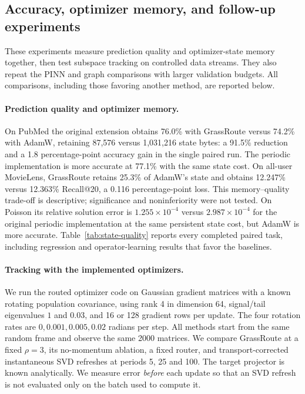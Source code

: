 \subsection{Accuracy, optimizer memory, and follow-up experiments}
\label{sec:strength-followup}
These experiments measure prediction quality and optimizer-state memory
together, then test subspace tracking on controlled data streams. They also
repeat the PINN and graph comparisons with larger validation budgets.
All comparisons, including those favoring another method, are reported below.

\paragraph{Prediction quality and optimizer memory.}
On PubMed the original extension obtains 76.0\% with GrassRoute versus
74.2\% with AdamW, retaining 87,576 versus 1,031,216 state bytes: a 91.5\%
reduction and a 1.8 percentage-point accuracy gain in the single paired run.
The periodic implementation is more accurate at 77.1\% with the same state
cost. On all-user MovieLens, GrassRoute retains 25.3\% of AdamW's state and
obtains 12.247\% versus 12.363\% Recall@20, a 0.116 percentage-point loss.
This memory--quality trade-off is descriptive; significance and
noninferiority were not tested. On Poisson its relative solution error is
$1.255\times10^{-4}$ versus $2.987\times10^{-4}$ for the original periodic
implementation at the same persistent state cost, but AdamW is more accurate.
Table~\ref{tab:state-quality} reports every completed paired task,
including regression and operator-learning results that favor the baselines.

\paragraph{Tracking with the implemented optimizers.}
We run the routed optimizer code on Gaussian gradient matrices with a known
rotating population covariance, using rank 4 in dimension 64, signal/tail
eigenvalues $1$ and $0.03$, and 16 or 128 gradient rows per update. The four
rotation rates are $0,0.001,0.005,0.02$ radians per step. All methods start
from the same random frame and observe the same 2000 matrices. We compare
GrassRoute at a fixed $\rho=3$, its no-momentum ablation, a fixed router,
and transport-corrected instantaneous SVD refreshes at periods 5, 25 and 100.
The target projector is known analytically. We measure error
\emph{before} each update so that an SVD refresh is not evaluated only
on the batch used to compute it.



